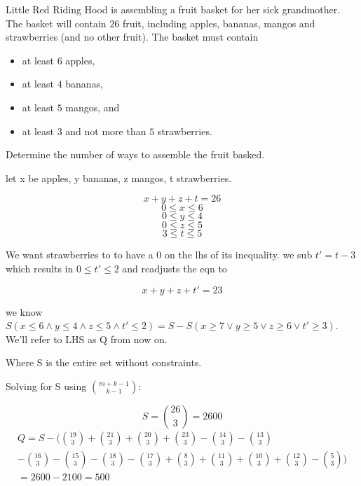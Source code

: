 
\begin{problem}
Little Red Riding Hood is assembling a fruit basket for her sick grandmother.
The basket will contain 26 fruit, including
apples, bananas, mangos and strawberries (and no other fruit). 
The basket must contain
%
\begin{itemize}
	\item at least $6$ apples, 
	\item at least $4$ bananas, 
	\item at least $5$ mangos, and
	\item at least $3$ and not more than $5$ strawberries. 
\end{itemize}
%
Determine the number of ways to assemble the fruit basked.
\end{problem}

\begin{solution}
let x be apples, y bananas, z mangos, t strawberries.

$$x+y+z+t=26$$
$$0\le x \le 6$$
$$0\le y \le 4$$
$$0\le z \le 5$$
$$3\le t \le 5$$

We want strawberries to to have a 0 on the lhs of its inequality. we sub $t'=t-3$ which results in $0 \le t' \le 2$ and readjusts the eqn to

$$x+y+z+t' = 23$$

we know $S(x \le 6 \land y \le 4 \land z \le 5 \land t' \le 2) = S - S(x \ge 7 \lor y \ge 5 \lor z \ge 6 \lor t' \ge 3)$. We'll refer to LHS as Q from now on.

Where S is the entire set without constraints.

Solving for S using ${m + k - 1} \choose {k - 1}$:

$$S = {26 \choose 3} = 2600$$
\begin{multline*}
Q = S - ( {19 \choose 3} + {21 \choose 3} + {20 \choose 3} + {23 \choose 3} - {14 \choose 3} - {13 \choose 3}\\
 - {16 \choose 3} - {15 \choose 3} - {18 \choose 3} - {17 \choose 3} + {8 \choose 3} + {11 \choose 3} + {10 \choose 3} + {12 \choose 3} - {5 \choose 3} )\\
 = 2600 - 2100
 = 500
\end{multline*}

\end{solution}
